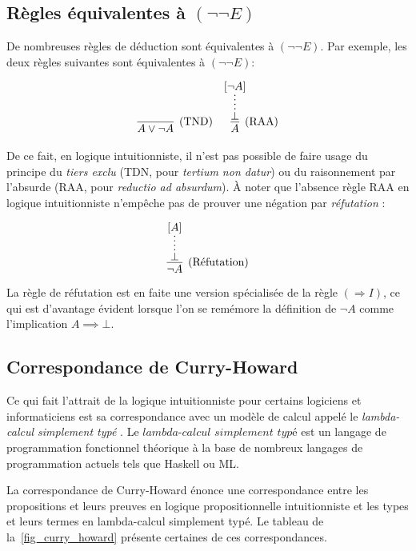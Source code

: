 \subsection{Règles équivalentes à $({\neg}{\neg}E)$}

De nombreuses règles de déduction sont équivalentes à $({\neg}{\neg}E)$. Par exemple, les deux règles suivantes sont équivalentes à $({\neg}{\neg}E)$:

\begin{align*}
\infer[(\text{TND})]{A \vee \neg A}{} &&
\infer[(\text{RAA})]{A}{\infer*{\bot}{[\neg A]}}
\end{align*}

De ce fait, en logique intuitionniste, il n'est pas possible de faire usage du principe du \textit{tiers exclu} (TDN, pour \textit{tertium non datur}) ou du raisonnement par l'absurde (RAA, pour \textit{reductio ad absurdum}). À noter que l'absence règle RAA en logique intuitionniste n'empêche pas de prouver une négation par \og \textit{réfutation} \fg{}:

\[
\infer[(\text{Réfutation})]{\neg A}{\infer*{\bot}{[A]}}
\]

La règle de réfutation est en faite une version spécialisée de la règle $({\Rightarrow}I)$, ce qui est d'avantage évident lorsque l'on se remémore la définition de $\neg A$ comme l'implication $A \implies \bot$.

\subsection{Correspondance de Curry-Howard}

Ce qui fait l'attrait de la logique intuitionniste pour certains logiciens et informaticiens est sa correspondance avec un modèle de calcul appelé le \og \textit{lambda-calcul simplement typé} \fg{}. Le $\textit{lambda-calcul simplement typé}$ est un langage de programmation fonctionnel théorique à la base de nombreux langages de programmation actuels tels que Haskell ou ML.

La correspondance de Curry-Howard énonce une correspondance entre les propositions et leurs preuves en logique propositionnelle intuitionniste et les types et leurs termes en lambda-calcul simplement typé. Le tableau de la~\cref{fig_curry_howard} présente certaines de ces correspondances.

